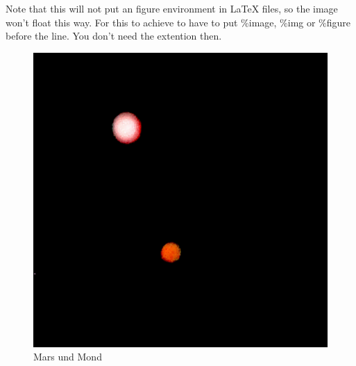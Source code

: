 \documentclass{scrartcl}
\begin{document}
Note that this will not put an figure environment in \LaTeX
files, so the image won't float this way. For this to
achieve to have to put \%image, \%img or \%figure before the
line. You don't need the extention then.

\begin{figure}[hbt]
\includegraphics[height=.20\textheight]{Image}
\caption{Mars und Mond}
\end{figure}
\end{document}
